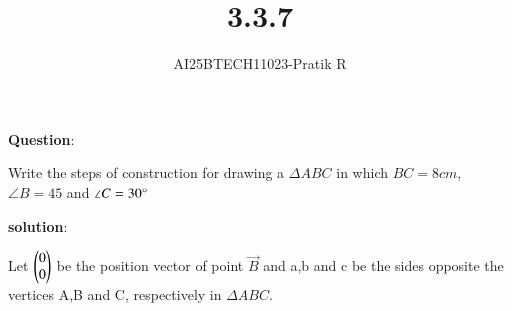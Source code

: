 \documentclass[journal]{IEEEtran}
\begin{document}

\vspace{3cm}

\title{3.3.7}
\author{AI25BTECH11023-Pratik R}
 \maketitle
{\let\newpage\relax\maketitle}

\renewcommand{\thefigure}{\theenumi}
\renewcommand{\thetable}{\theenumi}
\setlength{\intextsep}{10pt} %


\renewcommand{\thetable}{\theenumi}

\textbf{Question}:

Write the steps of construction for drawing a $\Delta ABC$ in which $BC= 8cm$, $\angle B= 45$
and $\angle C= 30\degree$

\textbf{solution}:

Let $\begin{pmatrix}0\\0\end{pmatrix}$ be the position vector of point $\vec{B}$ and a,b and c be the sides opposite the vertices A,B and C, respectively in $\Delta ABC$.
\end{document}

